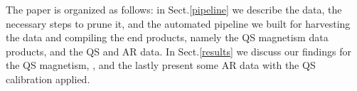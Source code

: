\documentclass{aa}
\begin{document}
The paper is organized as follows: in Sect.\ref{pipeline} we describe
the data, the necessary steps to prune it, and the automated pipeline we built for harvesting the data and compiling the end products, namely the QS magnetism data products, and the QS \fff and AR data. In
Sect.\ref{results} we discuss our findings for the QS magnetism, \fff, and the lastly present some AR data with the QS calibration
applied. 


\end{document}
